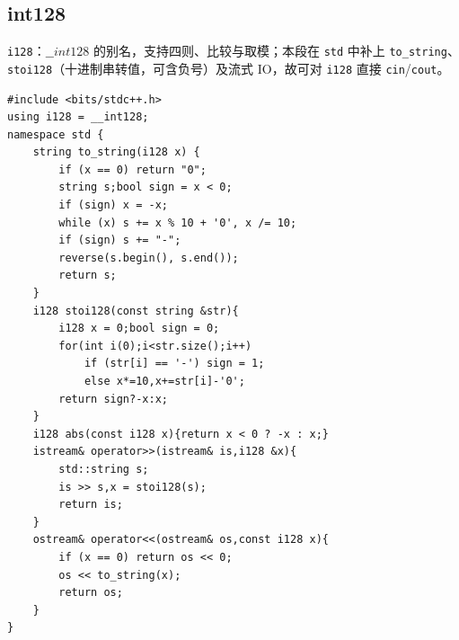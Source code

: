 \subsection{int128}

\verb|i128|：$\_\_int128$ 的别名，支持四则、比较与取模；本段在 \texttt{std} 中补上 \verb|to_string|、\verb|stoi128|（十进制串转值，可含负号）及流式 IO，故可对 \verb|i128| 直接 \texttt{cin}/\texttt{cout}。

\begin{lstlisting}
#include <bits/stdc++.h>
using i128 = __int128;
namespace std {
    string to_string(i128 x) {
        if (x == 0) return "0";
        string s;bool sign = x < 0;
        if (sign) x = -x;
        while (x) s += x % 10 + '0', x /= 10;
        if (sign) s += "-";
        reverse(s.begin(), s.end());
        return s;
    }
    i128 stoi128(const string &str){
        i128 x = 0;bool sign = 0;
        for(int i(0);i<str.size();i++)
            if (str[i] == '-') sign = 1;
            else x*=10,x+=str[i]-'0';
        return sign?-x:x;
    }
    i128 abs(const i128 x){return x < 0 ? -x : x;}
    istream& operator>>(istream& is,i128 &x){
        std::string s;
        is >> s,x = stoi128(s);
        return is;
    }
    ostream& operator<<(ostream& os,const i128 x){
        if (x == 0) return os << 0;
        os << to_string(x);
        return os;
    }
}
\end{lstlisting}
